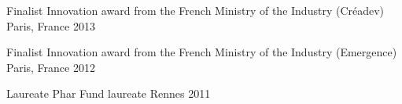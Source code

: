 



\begin{cvhonors}

  \cvhonor
    {Finalist} %
    {Innovation award from the French Ministry of the Industry (Créadev) } %
    {Paris, France} %
    {2013} %

  \cvhonor
  {Finalist} %
  {Innovation award from the French Ministry of the Industry (Emergence)} %
  {Paris, France} %
  {2012} %

  \cvhonor
    {Laureate} %
    {Phar Fund laureate} %
    {Rennes} %
    {2011} %


\end{cvhonors}





